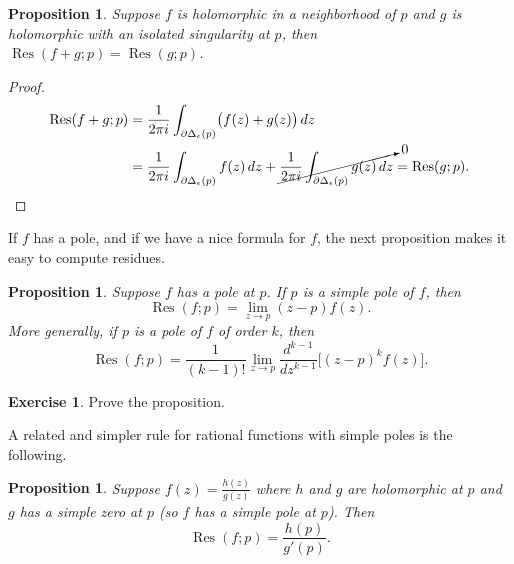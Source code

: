\documentclass[12pt,openany]{book}
\theoremstyle{plain}
\newtheorem{prop}[thm]{Proposition}
\theoremstyle{remark}
\theoremstyle{definition}
\newenvironment{exbox}{%
    \def\FrameCommand{\vrule width 1pt \relax\hspace {10pt}}%
    \MakeFramed {\advance \hsize -\width \FrameRestore }%
}{%
    \endMakeFramed
}
\theoremstyle{exercise}
\newtheorem{exercise}{Exercise}[section]
\theoremstyle{example}
\begin{document}
\begin{prop}
Suppose $f$ is holomorphic in a neighborhood of $p$ and $g$ is holomorphic
with an isolated singularity at $p$, then
$\operatorname{Res}(f+g;p) = \operatorname{Res}(g;p)$.
\end{prop}

\begin{proof}
\begin{equation*}
\begin{split}
\operatorname{Res}(f+g;p)
& =
\frac{1}{2\pi i}
\int_{\partial \Delta_{\epsilon}(p)}
\bigl(f(z)+g(z)\bigr) \, dz
\\
& =
\frac{1}{2\pi i}
\int_{\partial \Delta_{\epsilon}(p)}
f(z) \, dz
+
\cancelto{0}{
\frac{1}{2\pi i}
\int_{\partial \Delta_{\epsilon}(p)}
g(z) \, dz
}
=
\operatorname{Res}(g;p) . \qedhere
\end{split}
\end{equation*}
\end{proof}

If $f$ has a pole, and if we have a nice formula for $f$,
the next proposition makes it easy to compute residues.

\begin{prop}
Suppose $f$ has a pole at $p$.
If $p$ is a simple pole of $f$, then
\begin{equation*}
\operatorname{Res}(f;p) = \lim_{z\to p} (z-p) f(z) .
\end{equation*}
More generally, if $p$ is a pole of $f$ of order $k$, then
\begin{equation*}
\operatorname{Res}(f;p) = \frac{1}{(k-1)!} \lim_{z\to p}
\frac{d^{k-1}}{dz^{k-1}}\bigl[ (z-p)^{k} f(z) \bigr] .
\end{equation*}
\end{prop}

\begin{exbox}
\begin{exercise}
Prove the proposition.
\end{exercise}
\end{exbox}

A related and simpler rule for rational functions with simple poles is
the following.

\begin{prop} \label{prop:residuesimpleratio}
Suppose $f(z) = \frac{h(z)}{g(z)}$ where $h$ and $g$ are holomorphic
at $p$ and $g$ has a simple zero at $p$ (so $f$ has a simple pole at $p$).
Then
\begin{equation*}
\operatorname{Res}(f;p) = \frac{h(p)}{g'(p)} .
\end{equation*}
\end{prop}
\end{document}
